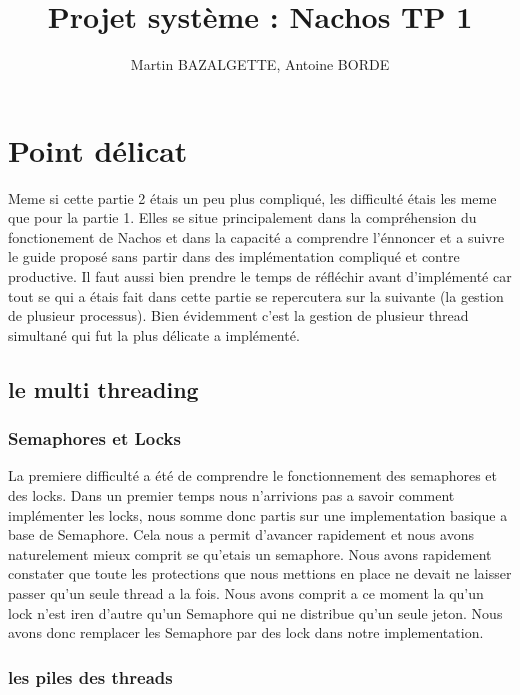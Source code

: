 \documentclass[12pt]{article}
\begin{document}
\title{Projet système : Nachos TP 1}
\author{Martin BAZALGETTE, Antoine BORDE}
\maketitle

\newpage
\tableofcontents
\newpage

\section {Point délicat}

Meme si cette partie 2 étais un peu plus compliqué, les difficulté étais les meme
que pour la partie 1. Elles se situe principalement dans la compréhension du fonctionement
de Nachos et dans la capacité a comprendre l'énnoncer et a suivre le guide proposé sans
partir dans des implémentation compliqué et contre productive. Il faut aussi
bien prendre le temps de réfléchir avant d'implémenté car tout se qui a étais fait dans
cette partie se repercutera sur la suivante (la gestion de plusieur processus).
\newline
Bien évidemment c'est la gestion de plusieur thread simultané qui fut la plus délicate
a implémenté.

\subsection{le multi threading}
\subsubsection{Semaphores et Locks}
La premiere difficulté a été de comprendre le fonctionnement des semaphores et des locks.
Dans un premier temps nous n'arrivions pas a savoir comment implémenter les locks, nous somme
donc partis sur une implementation basique a base de Semaphore. Cela nous a permit d'avancer
rapidement et nous avons naturelement mieux comprit se qu'etais un semaphore.
Nous avons rapidement constater que toute les protections que nous mettions en place ne
devait ne laisser passer qu'un seule thread a la fois. Nous avons comprit a ce moment la qu'un
lock n'est iren d'autre qu'un Semaphore qui ne distribue qu'un seule jeton.
Nous avons donc remplacer les Semaphore par des lock dans notre implementation.

\subsubsection{les piles des threads}
\end{document}
